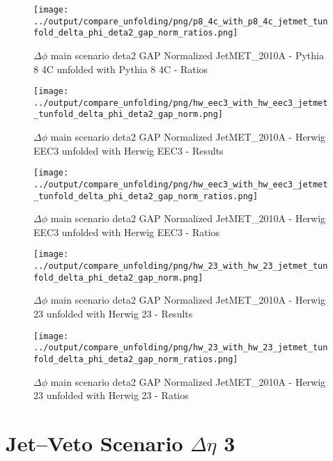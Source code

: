 \documentclass[11pt]{book}
\begin{document}
\begin{figure}[ht]
\centering
\texttt{[image: ../output/compare\_unfolding/png/p8\_4c\_with\_p8\_4c\_jetmet\_tunfold\_delta\_phi\_deta2\_gap\_norm\_ratios.png]}
\caption{$\Delta\phi$ main scenario deta2 GAP Normalized JetMET\_2010A - Pythia 8 4C unfolded with Pythia 8 4C - Ratios}
\label{p8_p8_jetmet_tunfold_delta_phi_deta2_gap_norm_b}
\end{figure}

\begin{figure}[ht]
\centering
\texttt{[image: ../output/compare\_unfolding/png/hw\_eec3\_with\_hw\_eec3\_jetmet\_tunfold\_delta\_phi\_deta2\_gap\_norm.png]}
\caption{$\Delta\phi$ main scenario deta2 GAP Normalized JetMET\_2010A - Herwig EEC3 unfolded with Herwig EEC3 - Results}
\label{hw_eec3_hw_eec3_jetmet_tunfold_delta_phi_deta2_gap_norm_a}
\end{figure}

\begin{figure}[ht]
\centering
\texttt{[image: ../output/compare\_unfolding/png/hw\_eec3\_with\_hw\_eec3\_jetmet\_tunfold\_delta\_phi\_deta2\_gap\_norm\_ratios.png]}
\caption{$\Delta\phi$ main scenario deta2 GAP Normalized JetMET\_2010A - Herwig EEC3 unfolded with Herwig EEC3 - Ratios}
\label{hw_eec3_hw_eec3_jetmet_tunfold_delta_phi_deta2_gap_norm_b}
\end{figure}

\begin{figure}[ht]
\centering
\texttt{[image: ../output/compare\_unfolding/png/hw\_23\_with\_hw\_23\_jetmet\_tunfold\_delta\_phi\_deta2\_gap\_norm.png]}
\caption{$\Delta\phi$ main scenario deta2 GAP Normalized JetMET\_2010A - Herwig 23 unfolded with Herwig 23 - Results}
\label{hw_23_hw_23_jetmet_tunfold_delta_phi_deta2_gap_norm_a}
\end{figure}

\begin{figure}[ht]
\centering
\texttt{[image: ../output/compare\_unfolding/png/hw\_23\_with\_hw\_23\_jetmet\_tunfold\_delta\_phi\_deta2\_gap\_norm\_ratios.png]}
\caption{$\Delta\phi$ main scenario deta2 GAP Normalized JetMET\_2010A - Herwig 23 unfolded with Herwig 23 - Ratios}
\label{hw_23_hw_23_jetmet_tunfold_delta_phi_deta2_gap_norm_b}
\end{figure}



\newpage
\chapter{Jet--Veto Scenario $\Delta\eta$ 3}
\end{document}
